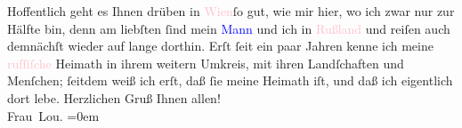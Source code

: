            \pstart
           Hoffentlich geht es Ihnen drüben in \textcolor{pink}{Wien}{}\ledrightnote{\textcolor{pink}{Wien}}{ }ſo
                    gut, wie mir hier, wo ich zwar nur zur Hälfte bin, denn {\pb}am liebſten ſind mein \textcolor{blue}{Mann}{} und ich in \textcolor{pink}{Rußland}{}\ledrightnote{\textcolor{pink}{Russland}} und reiſen auch demnächſt wieder
                    auf lange dorthin. Erſt ſeit ein paar Jahren kenne ich meine \textcolor{pink}{ruſſiſche}{}\ledrightnote{\textcolor{pink}{Russland}} Heimath in ihrem weitern Umkreis, mit ihren
                    Landſchaften und Menſchen; ſeitdem weiß ich erſt, daß ſie meine Heimath iſt, und
                    daß ich eigentlich dort lebe.\pend
           \pstart
           Herzlichen Gruß Ihnen allen!{\\[\baselineskip]}\spacefill\mbox{Frau Lou.}\pend
           \leftskip=0em{}\endnumbering{}  
      